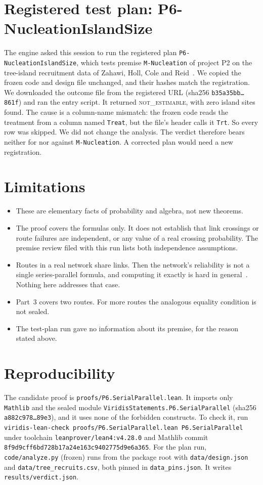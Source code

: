 \documentclass[11pt]{article}
\begin{document}
\section{Registered test plan: P6-NucleationIslandSize}
The engine asked this session to run the registered plan \texttt{P6-NucleationIslandSize}, which tests
premise \texttt{M-Nucleation} of project P2 on the tree-island recruitment data of Zahawi, Holl, Cole and
Reid~\citep{zahawi2014data}. We copied the frozen code and design file unchanged, and their hashes match
the registration. We downloaded the outcome file from the registered URL (sha256
\texttt{b35a35bb\ldots 861f}) and ran the entry script. It returned \textsc{not\_estimable}, with zero island
sites found. The cause is a column-name mismatch: the frozen code reads the treatment from a column named
\texttt{Treat}, but the file's header calls it \texttt{Trt}. So every row was skipped. We did not change the
analysis. The verdict therefore bears neither for nor against \texttt{M-Nucleation}. A corrected plan would
need a new registration.

\section{Limitations}
\begin{itemize}
\item These are elementary facts of probability and algebra, not new theorems.
\item The proof covers the formulas only. It does not establish that link crossings or route failures are
independent, or any value of a real crossing probability. The premise review filed with this run lists
both independence assumptions.
\item Routes in a real network share links. Then the network's reliability is not a single
series-parallel formula, and computing it exactly is hard in general~\citep{valiant1979}. Nothing here
addresses that case.
\item Part~3 covers two routes. For more routes the analogous equality condition is not sealed.
\item The test-plan run gave no information about its premise, for the reason stated above.
\end{itemize}

\section{Reproducibility}
The candidate proof is \texttt{proofs/P6.SerialParallel.lean}. It imports only \texttt{Mathlib} and the
sealed module \texttt{ViridisStatements.P6.SerialParallel} (sha256 \texttt{a882c978\ldots 89e3}), and it
uses none of the forbidden constructs. To check it, run
\texttt{viridis-lean-check proofs/P6.SerialParallel.lean P6.SerialParallel} under toolchain
\texttt{leanprover/lean4:v4.28.0} and Mathlib commit \texttt{8f9d9cff6bd728b17a24e163c9402775d9e6a365}.
For the plan run, \texttt{code/analyze.py} (frozen) runs from the package root with
\texttt{data/design.json} and \texttt{data/tree\_recruits.csv}, both pinned in \texttt{data\_pins.json}. It
writes \texttt{results/verdict.json}.
\end{document}
